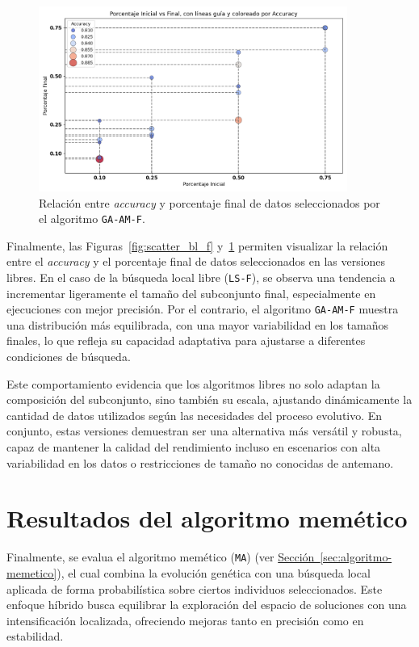 \begin{figure}[htp]
    \centering
    \includegraphics[width=0.9\textwidth]{imagenes/evaluaciones/libres/scatter_gen_v2}
    \caption{Relación entre \textit{accuracy} y porcentaje final de datos seleccionados por el algoritmo \texttt{GA-AM-F}.}
    \label{fig:scatter_gen_v2}
\end{figure}

Finalmente, las Figuras~\ref{fig:scatter_bl_f} y~\ref{fig:scatter_gen_v2} permiten visualizar la relación entre el \textit{accuracy}
y el porcentaje final de datos seleccionados en las versiones libres.
En el caso de la búsqueda local libre (\texttt{LS-F}), se observa una tendencia a incrementar ligeramente el tamaño del subconjunto final,
especialmente en ejecuciones con mejor precisión.
Por el contrario, el algoritmo \texttt{GA-AM-F} muestra una distribución más equilibrada, con una mayor variabilidad en los tamaños finales,
lo que refleja su capacidad adaptativa para ajustarse a diferentes condiciones de búsqueda.

Este comportamiento evidencia que los algoritmos libres no solo adaptan la composición del subconjunto, sino también su escala,
ajustando dinámicamente la cantidad de datos utilizados según las necesidades del proceso evolutivo.
En conjunto, estas versiones demuestran ser una alternativa más versátil y robusta,
capaz de mantener la calidad del rendimiento incluso en escenarios con alta variabilidad en los datos o restricciones de tamaño no conocidas de antemano.


\section{Resultados del algoritmo memético}\label{sec:resultados-algoritmo-memetico}
Finalmente, se evalua el algoritmo memético (\texttt{MA}) (ver \hyperref[sec:algoritmo-memetico]{Sección~\ref*{sec:algoritmo-memetico}}),
el cual combina la evolución genética con una búsqueda local aplicada de forma probabilística sobre ciertos individuos seleccionados.
Este enfoque híbrido busca equilibrar la exploración del espacio de soluciones con una intensificación localizada,
ofreciendo mejoras tanto en precisión como en estabilidad.


